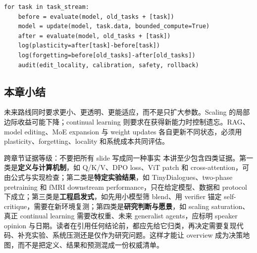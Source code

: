 \begin{lstlisting}[caption={Continual-learning evaluation 的最小协议}]
for task in task_stream:
    before = evaluate(model, old_tasks + [task])
    model = update(model, task.data, bounded_compute=True)
    after = evaluate(model, old_tasks + [task])
    log(plasticity=after[task]-before[task])
    log(forgetting=before[old_tasks]-after[old_tasks])
    audit(edit_locality, calibration, safety, rollback)
\end{lstlisting}

\subsection{本章小结}

未来路线同时要求更小、更透明、更能适应，而不是只扩大参数。Scaling 的局部边际收益可能下降；continual learning 则要求在获得新能力时控制遗忘。RAG、model editing、MoE expansion 与 weight updates 各自更新不同状态，必须用 plasticity、forgetting、locality 和系统成本共同评估。


\begin{importantbox}{跨章节证据等级：不要把所有 slide 写成同一种事实}
本讲至少包含四类证据。第一类是\textbf{定义与计算机制}，如 Q/K/V、DPO loss、ViT patch 和 cross-attention，可由公式与实现检查；第二类是\textbf{特定实验结果}，如 TinyDialogues、two-phase pretraining 和 fMRI downstream performance，只在给定模型、数据和 protocol 下成立；第三类是\textbf{工程启发式}，如先用小模型筛 blend、用 verifier 锚定 self-critique，需要在新环境复测；第四类是\textbf{研究判断与愿景}，如 scaling saturation、真正 continual learning 需要改权重、未来 generalist agents，应标明 speaker opinion 与日期。读者在引用任何结论前，都应先给它归类，再决定需要复现代码、补充实验、系统压测还是仅作为研究问题。这样才能让 overview 成为决策地图，而不是把定义、结果和预测混成一份权威清单。
\end{importantbox}

